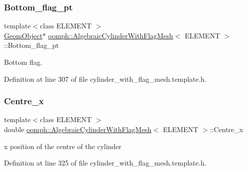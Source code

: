 \subsubsection{\texorpdfstring{Bottom\+\_\+flag\+\_\+pt}{Bottom\_flag\_pt}}
{\footnotesize\ttfamily template$<$class E\+L\+E\+M\+E\+NT $>$ \\
\hyperlink{classoomph_1_1GeomObject}{Geom\+Object}$\ast$ \hyperlink{classoomph_1_1AlgebraicCylinderWithFlagMesh}{oomph\+::\+Algebraic\+Cylinder\+With\+Flag\+Mesh}$<$ E\+L\+E\+M\+E\+NT $>$\+::Bottom\+\_\+flag\+\_\+pt\hspace{0.3cm}{\ttfamily [protected]}}



Bottom flag. 



Definition at line 307 of file cylinder\+\_\+with\+\_\+flag\+\_\+mesh.\+template.\+h.

\mbox{\label{classoomph_1_1AlgebraicCylinderWithFlagMesh_a3290ac9103e43f4a4a997fe4692b6506}} 
\subsubsection{\texorpdfstring{Centre\+\_\+x}{Centre\_x}}
{\footnotesize\ttfamily template$<$class E\+L\+E\+M\+E\+NT $>$ \\
double \hyperlink{classoomph_1_1AlgebraicCylinderWithFlagMesh}{oomph\+::\+Algebraic\+Cylinder\+With\+Flag\+Mesh}$<$ E\+L\+E\+M\+E\+NT $>$\+::Centre\+\_\+x\hspace{0.3cm}{\ttfamily [protected]}}



x position of the centre of the cylinder 



Definition at line 325 of file cylinder\+\_\+with\+\_\+flag\+\_\+mesh.\+template.\+h.

\mbox{\label{classoomph_1_1AlgebraicCylinderWithFlagMesh_a6b4575a9c3818e04bdb00d4150d49290}} 
